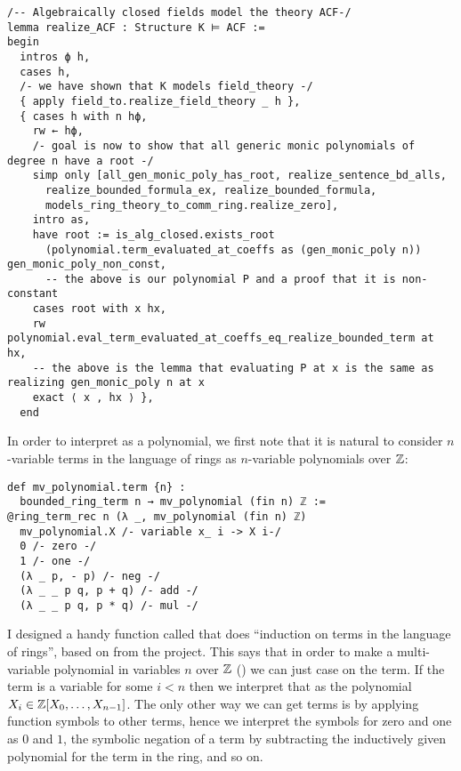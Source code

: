 \begin{lstlisting}
/-- Algebraically closed fields model the theory ACF-/
lemma realize_ACF : Structure K ⊨ ACF :=
begin
  intros ϕ h,
  cases h,
  /- we have shown that K models field_theory -/
  { apply field_to.realize_field_theory _ h },
  { cases h with n hϕ,
    rw ← hϕ,
    /- goal is now to show that all generic monic polynomials of degree n have a root -/
    simp only [all_gen_monic_poly_has_root, realize_sentence_bd_alls,
      realize_bounded_formula_ex, realize_bounded_formula,
      models_ring_theory_to_comm_ring.realize_zero],
    intro as,
    have root := is_alg_closed.exists_root
      (polynomial.term_evaluated_at_coeffs as (gen_monic_poly n)) gen_monic_poly_non_const,
      -- the above is our polynomial P and a proof that it is non-constant
    cases root with x hx,
    rw polynomial.eval_term_evaluated_at_coeffs_eq_realize_bounded_term at hx,
    -- the above is the lemma that evaluating P at x is the same as realizing gen_monic_poly n at x
    exact ⟨ x , hx ⟩ },
  end\end{lstlisting}

In order to interpret  as a polynomial,
we first note that it is natural to consider $n$-variable terms in the language of
rings as $n$-variable polynomials over $\mathbb{Z}$:

\begin{lstlisting}
def mv_polynomial.term {n} :
  bounded_ring_term n → mv_polynomial (fin n) ℤ :=
@ring_term_rec n (λ _, mv_polynomial (fin n) ℤ)
  mv_polynomial.X /- variable x_ i -> X i-/
  0 /- zero -/
  1 /- one -/
  (λ _ p, - p) /- neg -/
  (λ _ _ p q, p + q) /- add -/
  (λ _ _ p q, p * q) /- mul -/\end{lstlisting}

I designed a handy function called  that does
``induction on terms in the language of rings'',
based on  from the  project.
This says that in order to make a multi-variable polynomial in variables $n$
over $\mathbb{Z}$ () we can just case on the term.
If the term is a variable  for some $i < n$
then we interpret that as the polynomial $X_{i} \in \mathbb{Z}[X_{0},\dots,X_{n-1}]$.
The only other way we can get terms is by applying function symbols to other terms,
hence we interpret the symbols for zero and one as $0$ and $1$,
the symbolic negation of a term by subtracting the inductively given polynomial
for the term in the ring, and so on.

